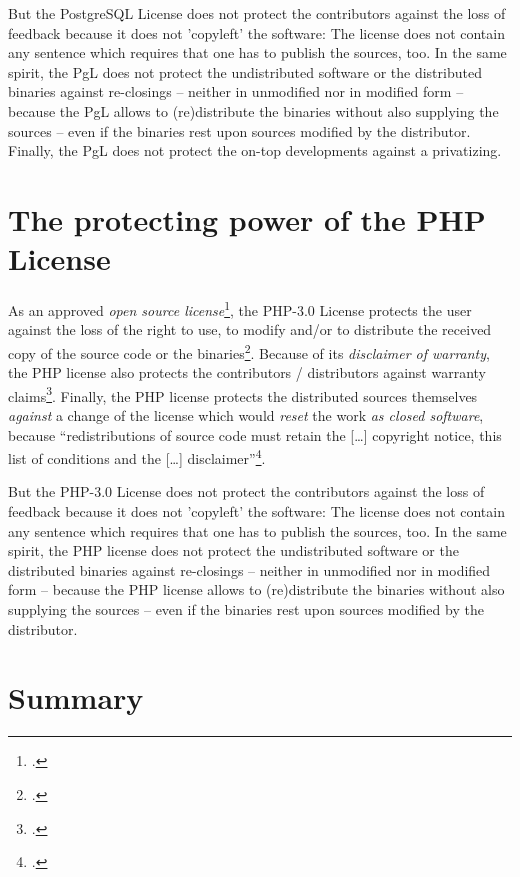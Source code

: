But the PostgreSQL License does not protect the contributors against the loss of
feedback because it does not 'copyleft' the software: The license does not
contain any sentence which requires that one has to publish the sources, too. 
In the same spirit, the PgL does not protect the undistributed software or the
distributed binaries against re-closings -- neither in unmodified nor in
modified form -- because the PgL allows to (re)distribute the binaries without
also supplying the sources -- even if the binaries rest upon sources modified by
the distributor. Finally, the PgL does not protect the on-top developments
against a privatizing.


\section{The protecting power of the PHP License}
\label{sec:ProtectingPowerOfPhp}

As an approved \emph{open source license}\footcite[cf.][\nopage wp]{OSI2012b},
the PHP-3.0 License protects the user against the loss of the right to use, to
modify and/or to distribute the received copy of the source code or the
binaries\footcite[cf.][\nopage wp]{Php30OsiLicense2013a}. Because of its
\emph{disclaimer of warranty}, the PHP license also protects the contributors /
distributors against warranty claims\footcite[cf.][\nopage
wp]{Php30OsiLicense2013a}. Finally, the PHP license protects the distributed
sources themselves \emph{against} a change of the license which would
\emph{reset} the work \emph{as closed software}, because
\enquote{redistributions of source code must retain the [\ldots] copyright
notice, this list of conditions and the [\ldots]
disclaimer}\footcite[cf.][\nopage wp]{Php30OsiLicense2013a}.

But the PHP-3.0 License does not protect the contributors against the loss of
feedback because it does not 'copyleft' the software: The license does not
contain any sentence which requires that one has to publish the sources, too. 
In the same spirit, the PHP license does not protect the undistributed software
or the distributed binaries against re-closings -- neither in unmodified nor in
modified form -- because the PHP license allows to (re)distribute the binaries
without also supplying the sources -- even if the binaries rest upon sources
modified by the distributor.
  
\section{Summary}

